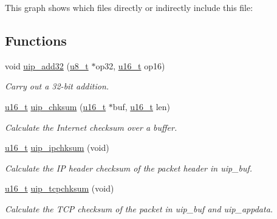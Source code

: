 This graph shows which files directly or indirectly include this file:\subsection*{Functions}
\begin{CompactItemize}
\item 
void \hyperlink{a00066_g6832e4d2d046536b6472f7ac92340f68}{uip\_\-add32} (\hyperlink{a00070_ge081489b4906f65a3cb18e9fbe9f8d23}{u8\_\-t} $\ast$op32, \hyperlink{a00070_gfc6499c1f28697aa3bfc2804d496fd11}{u16\_\-t} op16)
\begin{CompactList}\small\item\em Carry out a 32-bit addition. \item\end{CompactList}\item 
\hyperlink{a00070_gfc6499c1f28697aa3bfc2804d496fd11}{u16\_\-t} \hyperlink{a00066_gb6683dd83fe1c8de9a24086d4b69e907}{uip\_\-chksum} (\hyperlink{a00070_gfc6499c1f28697aa3bfc2804d496fd11}{u16\_\-t} $\ast$buf, \hyperlink{a00070_gfc6499c1f28697aa3bfc2804d496fd11}{u16\_\-t} len)
\begin{CompactList}\small\item\em Calculate the Internet checksum over a buffer. \item\end{CompactList}\item 
\hyperlink{a00070_gfc6499c1f28697aa3bfc2804d496fd11}{u16\_\-t} \hyperlink{a00066_g2addf34c7d457c1a7899a7e2171ef1e9}{uip\_\-ipchksum} (void)
\begin{CompactList}\small\item\em Calculate the IP header checksum of the packet header in uip\_\-buf. \item\end{CompactList}\item 
\hyperlink{a00070_gfc6499c1f28697aa3bfc2804d496fd11}{u16\_\-t} \hyperlink{a00066_g85b65e38aa74eba18979156f97a94a87}{uip\_\-tcpchksum} (void)
\begin{CompactList}\small\item\em Calculate the TCP checksum of the packet in uip\_\-buf and uip\_\-appdata. \item\end{CompactList}\end{CompactItemize}
